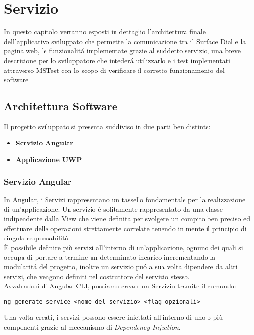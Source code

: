 \chapter{Servizio}
\label{chap:serv}
In questo capitolo verranno esposti in dettaglio l'architettura finale dell'applicativo sviluppato che permette la comunicazione tra il Surface Dial e la pagina web, le funzionalitá implementate grazie al suddetto servizio, una breve descrizione per lo sviluppatore che intederá utilizzarlo e i test implementati attraverso MSTest con lo scopo di verificare il corretto funzionamento del software
\section{Architettura Software}
Il progetto sviluppato si presenta suddiviso in due parti ben distinte:
\begin{itemize}
\item \textbf{Servizio Angular}
\item \textbf{Applicazione UWP}
\end{itemize}

\subsection{Servizio Angular}

In Angular, i Servizi rappresentano un tassello fondamentale per la realizzazione di un'applicazione. Un servizio è solitamente rappresentato da una classe indipendente dalla View che viene definita per svolgere un compito ben preciso ed effettuare delle operazioni strettamente correlate tenendo in mente il principio di singola responsabilità.\\
È possibile definire più servizi all'interno di un'applicazione, ognuno dei quali si occupa di portare a termine un determinato incarico incrementando la modularitá del progetto, inoltre un servizio puó a sua volta dipendere da altri servizi, che vengono definiti nel costruttore del servizio stesso.\\

Avvalendosi di Angular CLI, possiamo creare un Servizio tramite il comando:

\vspace{1.0cm}
\begin{lstlisting}[caption={Esempio creazione servizio},style=javaScriptCode]
	ng generate service <nome-del-servizio> <flag-opzionali>
\end{lstlisting} 
\vspace{1.0cm}
Una volta creati, i servizi possono essere iniettati all'interno di uno o più componenti grazie al meccanismo di \emph{Dependency Injection}.\\

